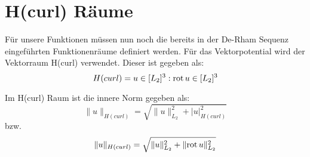\section{H(curl) R\"aume}
F\"ur unsere Funktionen m\"ussen nun noch die bereits in der De-Rham Sequenz eingef\"uhrten Funktionenr\"aume definiert werden. F\"ur das Vektorpotential wird der Vektorraum H(curl) verwendet. Dieser ist gegeben als:
\begin{equation}
	H(curl) = u\in [L_2]^3:\mathrm{rot}\, u\in [L_2]^3
	\label{eq:hcurl}
\end{equation}
\par
Im H(curl) Raum ist die innere Norm gegeben als:
\begin{equation}
	\|u\|_{H(curl)} = \sqrt{\|u\|^2_{L_2} + |u|^2_{H(curl)}}
\end{equation}
bzw.
\begin{equation}
	\|u\|_{H(curl)} = \sqrt{\|u\|^2_{L_2} + \|\mathrm{rot}\, u\|^2_{L_2}}
\end{equation}